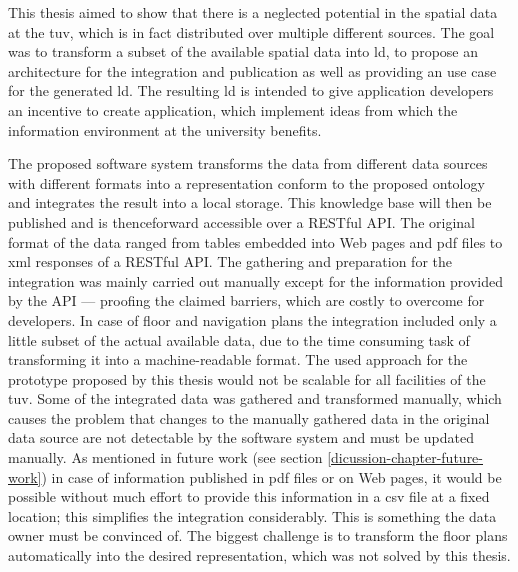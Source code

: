 \documentclass[draft,final]{vutinfth} %
\begin{document}
This thesis aimed to show that there is a neglected potential in the spatial data at the \gls{tuv}, which is in fact distributed over multiple different sources. The goal was to transform a subset of the available spatial data into \gls{ld}, to propose an architecture for the integration and publication as well as providing an use case for the generated \gls{ld}. The resulting \gls{ld} is intended to give application developers an incentive to create application, which implement ideas from which the information environment at the university benefits. 

The proposed software system transforms the data from different data sources with different formats into a representation conform to the proposed ontology and integrates the result into a local storage. This knowledge base will then be published and is thenceforward accessible over a RESTful API. The original format of the data ranged from tables embedded into Web pages and \gls{pdf} files to \gls{xml} responses of a RESTful API. The gathering and preparation for the integration was mainly carried out manually except for the information provided by the API --- proofing the claimed barriers, which are costly to overcome for developers. In case of floor and navigation plans the integration included only a little subset of the actual available data, due to the time consuming task of transforming it into a machine-readable format. The used approach for the prototype proposed by this thesis would not be scalable for all facilities of the \gls{tuv}. Some of the integrated data was gathered and transformed manually, which causes the problem that changes to the manually gathered data in the original data source are not detectable by the software system and must be updated manually. As mentioned in future work (see section \ref{dicussion-chapter-future-work}) in case of information published in \gls{pdf} files or on Web pages, it would be possible without much effort to provide this information in a \gls{csv} file at a fixed location; this simplifies the integration considerably. This is something the data owner must be convinced of. The biggest challenge is to transform the floor plans automatically into the desired representation, which was not solved by this thesis. 
\end{document}
